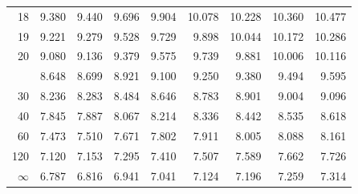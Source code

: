 \documentclass[10pt]{article}
\begin{document}
\begin{longtable}{@{}r!{\vrule width 0.8pt\hspace{0.55em}}rrrrrrrr@{}}
18 & 9.380 & 9.440 & 9.696 & 9.904 & 10.078 & 10.228 & 10.360 & 10.477 \\
19 & 9.221 & 9.279 & 9.528 & 9.729 & 9.898 & 10.044 & 10.172 & 10.286 \\
20 & 9.080 & 9.136 & 9.379 & 9.575 & 9.739 & 9.881 & 10.006 & 10.116 \\
 & 8.648 & 8.699 & 8.921 & 9.100 & 9.250 & 9.380 & 9.494 & 9.595 \\
30 & 8.236 & 8.283 & 8.484 & 8.646 & 8.783 & 8.901 & 9.004 & 9.096 \\
40 & 7.845 & 7.887 & 8.067 & 8.214 & 8.336 & 8.442 & 8.535 & 8.618 \\
60 & 7.473 & 7.510 & 7.671 & 7.802 & 7.911 & 8.005 & 8.088 & 8.161 \\
120 & 7.120 & 7.153 & 7.295 & 7.410 & 7.507 & 7.589 & 7.662 & 7.726 \\
\addlinespace[0.30em]
$\infty$ & 6.787 & 6.816 & 6.941 & 7.041 & 7.124 & 7.196 & 7.259 & 7.314 \\
\end{longtable}
\end{document}
